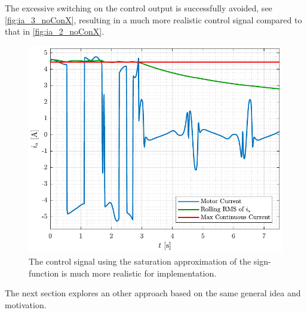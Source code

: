 %
The excessive switching on the control output is successfully avoided, see \autoref{fig:ia_3_noConX}, resulting in a much more realistic control signal compared to that in \autoref{fig:ia_2_noConX}.
%
\begin{figure}[H]
  \includegraphics[width=.52\textwidth]{figures/ia_3_noConX}
  \caption{The control signal using the saturation approximation of the sign-function is much more realistic for implementation.}
  \label{fig:ia_3_noConX}
\end{figure}
The next section explores an other approach based on the same general idea and motivation.
%
%

